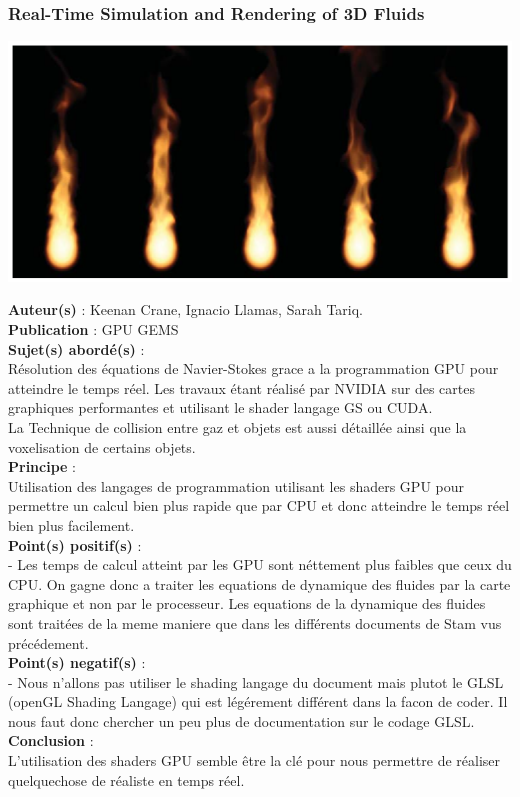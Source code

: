 \documentclass[a4paper,10pt]{article}
\begin{document}
\subsubsection{Real-Time Simulation and Rendering of 3D Fluids}
    \begin{center}
	\includegraphics[scale=0.5]{RealGPU.ps}
    \end{center}
\textbf{Auteur(s)} : Keenan Crane, Ignacio Llamas, Sarah Tariq.\\
\textbf{Publication} : GPU GEMS \\
\textbf{Sujet(s) abordé(s)} : \\ 
	Résolution des équations de Navier-Stokes grace a la programmation GPU pour atteindre le temps réel. Les travaux étant réalisé par NVIDIA sur des cartes graphiques performantes et utilisant le shader langage GS ou CUDA.\\
	La Technique de collision entre gaz et objets est aussi détaillée ainsi que la voxelisation de certains objets.\\
\textbf{Principe} :\\	
	Utilisation des langages de programmation utilisant les shaders GPU pour permettre un calcul bien plus rapide que par CPU et donc atteindre le temps réel bien plus facilement.\\
\textbf{Point(s) positif(s)} :\\
	- Les temps de calcul atteint par les GPU sont néttement plus faibles que ceux du CPU. On gagne donc a traiter les equations de dynamique des fluides par la carte graphique et non par le processeur. Les equations de la dynamique des fluides sont traitées de la meme maniere que dans les différents documents de Stam vus précédement.\\
\textbf{Point(s) negatif(s)} :\\
	- Nous n'allons pas utiliser le shading langage du document mais plutot le GLSL (openGL Shading Langage) qui est légérement différent dans la facon de coder. Il nous faut donc chercher un peu plus de documentation sur le codage GLSL.\\
\textbf{Conclusion} :\\
	L'utilisation des shaders GPU semble être la clé pour nous permettre de réaliser quelquechose de réaliste en temps réel.\\
\end{document}
